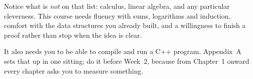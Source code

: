 \begin{conceptbox}
Notice what is \emph{not} on that list: calculus, linear algebra, and any
particular cleverness. This course needs fluency with sums, logarithms and
induction, comfort with the data structures you already built, and a
willingness to finish a proof rather than stop when the idea is clear.

\smallskip
It also needs you to be able to compile and run a C++ program. Appendix~A sets
that up in one sitting; do it before Week~2, because from Chapter~1 onward
every chapter asks you to measure something.
\end{conceptbox}

\newpage
\tableofcontents
\newpage
\listoffigures
\newpage

